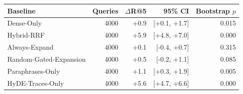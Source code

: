 \begin{tabular}{lrrrr}
\toprule
Baseline & Queries & $\Delta$R@5 & 95\% CI & Bootstrap $p$ \\
\midrule
Dense-Only & 4000 & +0.9 & [+0.1, +1.7] & 0.015 \\
Hybrid-RRF & 4000 & +5.9 & [+4.8, +7.0] & 0.000 \\
Always-Expand & 4000 & +0.1 & [-0.4, +0.7] & 0.315 \\
Random-Gated-Expansion & 4000 & +0.5 & [-0.2, +1.1] & 0.085 \\
Paraphrases-Only & 4000 & +1.1 & [+0.3, +1.9] & 0.005 \\
HyDE-Traces-Only & 4000 & +5.6 & [+4.7, +6.6] & 0.000 \\
\bottomrule
\end{tabular}

